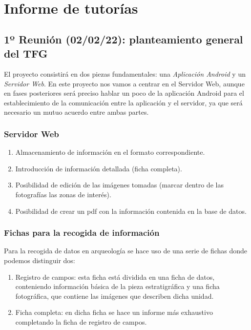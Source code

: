 \chapter{Informe de tutorías} \label{ch:meetings}
\section{1º Reunión (02/02/22): planteamiento general del TFG}
El proyecto consistirá en dos piezas fundamentales: una \textit{Aplicación Android} y un 
\textit{Servidor Web}. En este proyecto nos vamos a centrar en el Servidor Web, aunque en
fases posteriores será preciso hablar un poco de la aplicación Android para el establecimiento
de la comunicación entre la aplicación y el servidor, ya que será necesario un mutuo acuerdo
entre ambas partes.

    \subsection{Servidor Web}

        \begin{enumerate}
            \item Almacenamiento de información en el formato correspondiente.
            \item Introducción de información detallada (ficha completa).
            \item Posibilidad de edición de las imágenes tomadas (marcar dentro de las
            fotografías las zonas de interés).
            \item Posibilidad de crear un pdf con la información contenida en la base de
            datos.
        \end{enumerate}

    \subsection{Fichas para la recogida de información}
    Para la recogida de datos en arqueología se hace uso de una serie de fichas donde podemos
    distinguir dos:

        \begin{enumerate}
            \item Registro de campos: esta ficha está dividida en una ficha de datos,
            conteniendo información básica de la pieza estratigráfica y una ficha fotográfica,
            que contiene las imágenes que describen dicha unidad.
            \item Ficha completa: en dicha ficha se hace un informe más exhaustivo completando
            la ficha de registro de campos.
        \end{enumerate}

